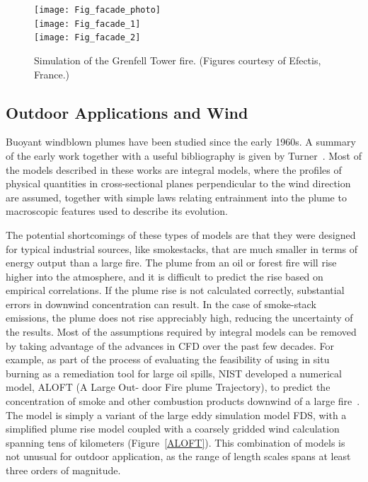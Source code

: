 \documentclass[graybox]{svmult}
\begin{document}
\begin{figure}[ht]
\begin{center}
\texttt{[image: Fig\_facade\_photo]} \\
\texttt{[image: Fig\_facade\_1]} \\
\texttt{[image: Fig\_facade\_2]}
\end{center}
\caption{Simulation of the Grenfell Tower fire. (Figures courtesy of Efectis, France.)}
\label{Grenfell}
\end{figure}



\subsection{Outdoor Applications and Wind}

Buoyant windblown plumes have been studied since the early 1960s. A summary of the early work together with a useful bibliography is given by Turner~\cite{Turner}. Most of the models described in these works are integral models, where the profiles of physical quantities in cross-sectional planes perpendicular to the wind direction are assumed, together with simple laws relating entrainment into the plume to macroscopic features used to describe its evolution.

The potential shortcomings of these types of models are that they were designed for typical industrial sources, like smokestacks, that are much smaller in terms of energy output than a large fire. The plume from an oil or forest fire will rise higher into the atmosphere, and it is difficult to predict the rise based on empirical correlations. If the plume rise is not calculated correctly, substantial errors in downwind concentration can result. In the case of smoke-stack emissions, the plume does not rise appreciably high, reducing the uncertainty of the results.
Most of the assumptions required by integral models can be removed by taking advantage of the advances in CFD over the past few decades. For example, as part of the process of evaluating the feasibility of using in situ burning as a remediation tool for large oil spills, NIST developed a numerical model, ALOFT (A Large Out- door Fire plume Trajectory), to predict the concentration of smoke and other combustion products downwind of a large fire~\cite{Baum}. The model is simply a variant of the large eddy simulation model FDS, with a simplified plume rise model coupled with a coarsely gridded wind calculation spanning tens of kilometers (Figure~\ref{ALOFT}). This combination of models is not unusual for outdoor application, as the range of length scales spans at least three orders of magnitude.
\end{document}
